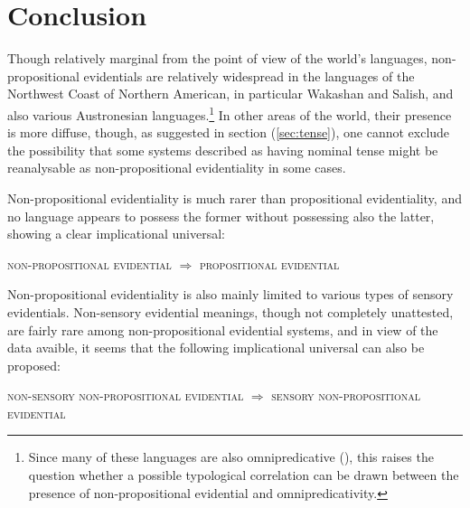 \documentclass[oneside,a4paper,11pt]{article}
\begin{document}
\section{Conclusion}
Though relatively marginal from the point of view of the world's languages, non-propositional evidentials are relatively widespread in the languages of the Northwest Coast of Northern American, in particular Wakashan and Salish, and also various Austronesian languages.\footnote{Since many of these languages are also omnipredicative (\citealt{launey94, francois03predicat}), this raises the question whether a possible typological correlation can be drawn between the presence of non-propositional evidential and omnipredicativity. } In other areas of the world, their presence is more diffuse, though, as suggested in section (\ref{sec:tense}), one cannot exclude the possibility that some systems described as having nominal tense might be reanalysable  as non-propositional evidentiality in some cases.

Non-propositional evidentiality is much rarer than propositional evidentiality, and no language appears to possess the former without possessing also the latter, showing a clear implicational universal: 

\begin{exe}
\ex 
\glt \textsc{non-propositional evidential} $\Rightarrow$ \textsc{propositional evidential}
\end{exe}

Non-propositional evidentiality is also mainly limited to various types of sensory evidentials. Non-sensory evidential meanings, though not completely unattested, are fairly rare among non-propositional evidential systems, and  in view of the data avaible, it seems that the following implicational universal can also be proposed:

\begin{exe}
\ex 
\glt \textsc{non-sensory non-propositional evidential} $\Rightarrow$ \textsc{sensory non-propositional evidential}
\end{exe}



\end{document}
